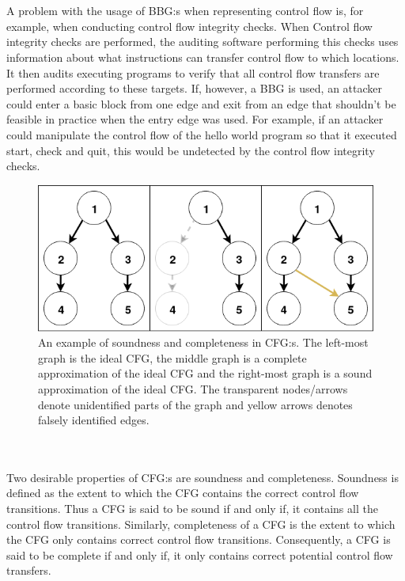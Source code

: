 \documentclass{kththesis}
\begin{document}
\\ \\
A problem with the usage of BBG:s when representing control flow is, for example, when conducting control flow integrity checks. When Control flow integrity checks are performed, the auditing software performing this checks uses information about what instructions can transfer control flow to which locations. It then audits executing programs to verify that all control flow transfers are performed according to these targets. If, however, a BBG is used, an attacker could enter a basic block from one edge and exit from an edge that shouldn't be feasible in practice when the entry edge was used. For example, if an attacker could manipulate the control flow of the hello world program so that it executed start, check and quit, this would be undetected by the control flow integrity checks. 
\begin{figure}[t]
    \centering
    \includegraphics[scale=0.6]{Images/SoundCompleteGraph.png}
    \caption{An example of soundness and completeness in CFG:s. The left-most graph is the ideal CFG, the middle graph is a complete approximation of the ideal CFG and the right-most graph is a sound approximation of the ideal CFG. The transparent nodes/arrows denote unidentified parts of the graph and yellow arrows denotes falsely identified edges.}
    \label{fig:SoundCompleteGraph}
\end{figure}
\\ \\
Two desirable properties of CFG:s are soundness and completeness\cite{angr}. Soundness is defined as the extent to which the CFG contains the correct control flow transitions. Thus a CFG is said to be sound if and only if, it contains all the control flow transitions. Similarly, completeness of a CFG is the extent to which the CFG only contains correct control flow transitions. Consequently, a CFG is said to be complete if and only if, it only contains correct potential control flow transfers. 
\end{document}
